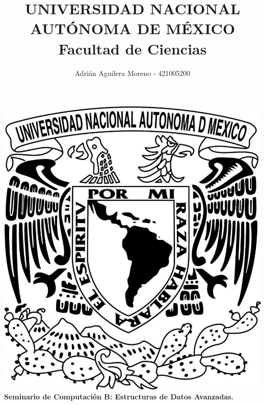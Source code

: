 \title{UNIVERSIDAD NACIONAL AUT\'ONOMA DE M\'EXICO\\ Facultad de Ciencias}
\author{ Adri\'an Aguilera Moreno   - 421005200 }
\date{}
\maketitle
\begin{center}
  \includegraphics[scale=0.20]{../Portada/Portada}\\[0.4cm]
  \Large
  \bf{Seminario de Computación B: Estructuras de Datos Avanzadas.}
  \normalsize
\end{center}
\newpage
{}

